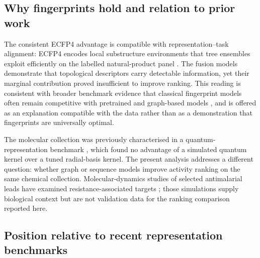 \documentclass[11pt,a4paper]{article}
\begin{document}
\subsection{Why fingerprints hold and relation to prior work}

The consistent ECFP4 advantage is compatible with representation--task alignment: ECFP4 encodes local substructure environments that tree ensembles exploit efficiently on the labelled natural-product panel \citep{ecfp_2010,learning_mol_repr_2020}. The fusion models demonstrate that topological descriptors carry detectable information, yet their marginal contribution proved insufficient to improve ranking. This reading is consistent with broader benchmark evidence that classical fingerprint models often remain competitive with pretrained and graph-based models \citep{guo_ding_2026,benchmark_pretrained_2025}, and is offered as an explanation compatible with the data rather than as a demonstration that fingerprints are universally optimal.

The molecular collection was previously characterised in a quantum-representation benchmark \citep{temgoua2027quantum}, which found no advantage of a simulated quantum kernel over a tuned radial-basis kernel. The present analysis addresses a different question: whether graph or sequence models improve activity ranking on the same chemical collection. Molecular-dynamics studies of selected antimalarial leads have examined resistance-associated targets \citep{temgoua2027md}; those simulations supply biological context but are not validation data for the ranking comparison reported here.

\subsection{Position relative to recent representation benchmarks}
\end{document}
